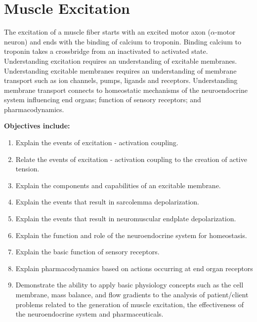 \chapter{Muscle Excitation}\label{chp:excitation}
\minitoc

The excitation of a muscle fiber starts with an excited motor axon ($\alpha$-motor neuron) and ends with the binding of calcium to troponin. Binding calcium to troponin  takes a crossbridge from an inactivated to activated state. Understanding excitation requires an understanding of excitable membranes. Understanding excitable membranes requires an understanding of membrane transport such as ion channels, pumps, ligands and receptors. Understanding membrane transport connects to homeostatic mechanisms of the neuroendocrine system influencing end organs; function of sensory receptors; and pharmacodynamics.

\vspace{5mm}

\textbf{Objectives include:}
\begin{enumerate}
    \item Explain the events of excitation - activation coupling.
    \item Relate the events of excitation - activation coupling to the creation of active tension.
\item Explain the components and capabilities of an excitable membrane.
    \item Explain the events that result in sarcolemma depolarization.
   \item Explain the events that result in neuromuscular endplate depolarization.
    \item Explain the function and role of the neuroendocrine system for homeostasis.
\item Explain the basic function of sensory receptors.
    \item Explain pharmacodynamics based on actions occurring at end organ receptors
   \item Demonstrate the ability to apply basic physiology concepts such as the cell membrane, mass balance, and flow gradients to the analysis of patient/client problems related to the generation of muscle excitation, the effectiveness of the neuroendocrine system and pharmaceuticals.
\end{enumerate}

